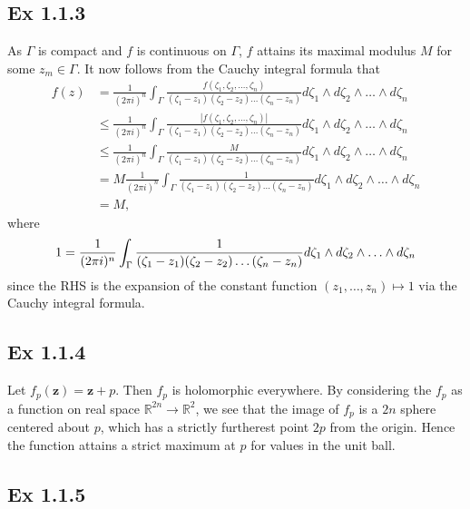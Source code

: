 \documentclass{article}
\theoremstyle{definition}
\newcommand{\R}{\mathbb{R}}
\begin{document}
\subsection*{Ex 1.1.3}

As $\Gamma$ is compact and $f$ is continuous on $\Gamma$, $f$ attains its
maximal modulus $M$ for some $z_m \in \Gamma$. It now follows from the Cauchy
integral formula that
\begin{align*}
	f(z)
	&=
	\frac{1}{(2\pi i)^n}
	\int_{\Gamma}
	\frac{f(\zeta_1, \zeta_2, \ldots, \zeta_n)}{(\zeta_1 - z_1)(\zeta_2 - z_2) \ldots (\zeta_n - z_n)}
	d\zeta_1 \wedge d\zeta_2 \wedge \ldots \wedge d\zeta_n \\
	& \leq
	\frac{1}{(2\pi i)^n}
	\int_{\Gamma}
	\frac{|f(\zeta_1, \zeta_2, \ldots, \zeta_n)|}{(\zeta_1 - z_1)(\zeta_2 - z_2) \ldots (\zeta_n - z_n)}
	d\zeta_1 \wedge d\zeta_2 \wedge \ldots \wedge d\zeta_n \\
	& \leq
	\frac{1}{(2\pi i)^n}
	\int_{\Gamma}
	\frac{M}{(\zeta_1 - z_1)(\zeta_2 - z_2) \ldots (\zeta_n - z_n)}
	d\zeta_1 \wedge d\zeta_2 \wedge \ldots \wedge d\zeta_n \\
	&=
	M
	\frac{1}{(2\pi i)^n}
	\int_{\Gamma}
	\frac{1}{(\zeta_1 - z_1)(\zeta_2 - z_2) \ldots (\zeta_n - z_n)}
	d\zeta_1 \wedge d\zeta_2 \wedge \ldots \wedge d\zeta_n \\
	&=
	M,
\end{align*}
where
\[
	1
	=
	\frac{1}{(2\pi i)^n}
	\int_{\Gamma}
	\frac{1}{(\zeta_1 - z_1)(\zeta_2 - z_2) \ldots (\zeta_n - z_n)}
	d\zeta_1 \wedge d\zeta_2 \wedge \ldots \wedge d\zeta_n \\
\] 
since the RHS is the expansion of the constant function $(z_1, \ldots, z_n)
\mapsto 1$ via the Cauchy integral formula.

\subsection*{Ex 1.1.4}

Let $f_p(\bm{z}) =  \bm{z} + p$. Then $f_p$ is holomorphic everywhere. By
considering the $f_p$ as a function on real space $\R^{2n} \to \R^2$, we see
that the image of $f_p$ is a $2n$ sphere centered about $p$, which has a
strictly furtherest point $2p$ from the origin. Hence the function attains a
strict maximum at $p$ for values in the unit ball.


\subsection*{Ex 1.1.5}
\end{document}
